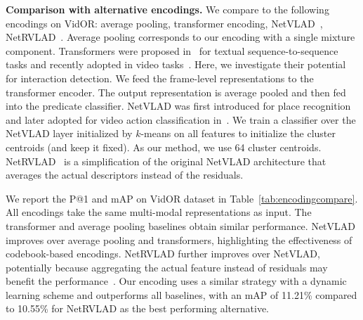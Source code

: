 \documentclass[10pt,twocolumn,letterpaper]{article}
\begin{document}
\textbf{Comparison with alternative encodings.}
We compare to the following encodings on VidOR: average pooling, transformer encoding, NetVLAD~\cite{girdhar2017actionvlad}, NetRVLAD~\cite{miech2017learnable}. 
Average pooling corresponds to our encoding with a single mixture component. Transformers were proposed in~\cite{vaswani2017attention} for textual sequence-to-sequence tasks and recently adopted in  video tasks~\cite{byvshev2020heterogeneous,girdhar2019video,gavrilyuk2020actor}. 
Here, we investigate their potential for interaction detection. We feed the frame-level representations to the transformer encoder. The output representation is average pooled and then fed into the predicate classifier. NetVLAD was first introduced for place recognition and later adopted for video action classification in~\cite{girdhar2017actionvlad}. We train a classifier over the NetVLAD layer initialized by $k$-means on all features to initialize the cluster centroids (and keep it fixed). As our method, we use 64 cluster centroids. NetRVLAD~\cite{miech2017learnable} is a simplification of the original NetVLAD architecture that averages the actual descriptors instead of the residuals.

We report the P@1 and mAP on VidOR dataset in Table~\ref{tab:encodingcompare}. 
All encodings take the same multi-modal representations as input. 
The transformer and average pooling baselines obtain similar performance. NetVLAD improves over average pooling and transformers, highlighting the effectiveness of codebook-based encodings. NetRVLAD further improves over NetVLAD, potentially because aggregating the actual feature instead of residuals may benefit the performance~\cite{douze2013stable}. Our encoding uses a similar strategy with a dynamic learning scheme and outperforms all baselines, with an mAP of 11.21\% compared to 10.55\% for NetRVLAD as the best performing alternative.
\end{document}
